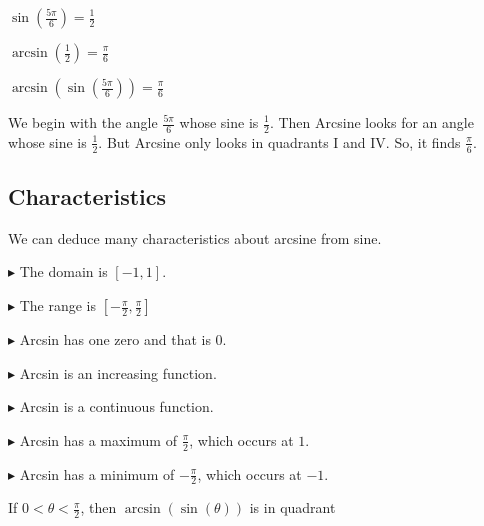 \documentclass{ximera}
\begin{document}
\begin{example}



$\sin\left(\frac{5\pi}{6}\right) = \frac{1}{2}$

$\arcsin\left(\frac{1}{2}\right) = \frac{\pi}{6}$


$\arcsin\left(\sin\left(\frac{5\pi}{6}\right)\right) = \frac{\pi}{6}$




We begin with the angle $\frac{5\pi}{6}$ whose sine is $\frac{1}{2}$.  Then Arcsine looks for an angle whose sine is $\frac{1}{2}$.  But Arcsine only looks in quadrants I and IV.  So, it finds $\frac{\pi}{6}$.


\end{example}









\subsection{Characteristics} 

We can deduce many characteristics about arcsine from sine.


$\blacktriangleright$ The domain is  $[-1, 1]$.


$\blacktriangleright$ The range is $\left[ -\frac{\pi}{2}, \frac{\pi}{2} \right]$


$\blacktriangleright$ Arcsin has one zero and that is $0$.


$\blacktriangleright$ Arcsin is an increasing function.

$\blacktriangleright$ Arcsin is a continuous function.

$\blacktriangleright$ Arcsin has a maximum of $\frac{\pi}{2}$, which occurs at $1$.

$\blacktriangleright$ Arcsin has a minimum of $-\frac{\pi}{2}$, which occurs at $-1$.



\begin{question}


If $0 < \theta < \frac{\pi}{2}$, then $\arcsin(\sin(\theta))$ is in quadrant

\begin{multipleChoice}
\end{multipleChoice}

\end{question}
\end{document}

